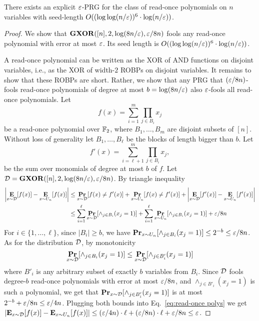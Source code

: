 \begin{thm}\label{thm:read-once poly}
There exists an explicit $\varepsilon$-PRG for the class of read-once polynomials on $n$ variables with seed-length $O((\log \log(n/\varepsilon))^6 \cdot \log(n/\varepsilon))$.
\end{thm}
\begin{proof}
We show that $\mathbf{GXOR}([n],2, \log(8n/\varepsilon),\varepsilon/8n)$ fools any read-once polynomial with error at most $\varepsilon$. Its seed length is $O((\log \log(n/\varepsilon))^6 \cdot \log(n/\varepsilon))$.

	A read-once polynomial can be written as the XOR of AND functions on disjoint variables, i.e., as the XOR of width-$2$ ROBPs on disjoint variables.
	It remains to show that these ROBPs are short.
	Rather, we show that any PRG that $(\varepsilon/8n)$-fools read-once polynomials of degree at most $b = \log(8n/\varepsilon)$ also $\varepsilon$-fools all read-once polynomials.
Let	$$f(x) = \sum_{i=1}^{m} \prod_{j\in B_i} x_j$$ be a read-once polynomial over ${\mathbb{F}}_2$, where $B_1, \ldots, B_m$ are disjoint subsets of $[n]$.
Without loss of generality let $B_1, \ldots, B_\ell$ be the blocks of length bigger than $b$. 
Let $$f'(x) = \sum_{i=\ell+1}^{m} \prod_{j\in B_i} x_j,$$ be the sum over monomials of degree at most $b$ of $f$.
Let ${\mathcal{D}} = \mathbf{GXOR}([n],2, \log(8n/\varepsilon),\varepsilon/8n)$. By triangle inequality
\begin{align}\nonumber\left|\mathop{\bf E\/}_{x\sim {\mathcal{D}}}[f(x)] -\mathop{\bf E\/}_{x\sim U_n}[f(x)]\right| &\le \mathop{\bf Pr\/}_{x\sim {\mathcal{D}}}[f(x) \neq f'(x)] + \mathop{\bf Pr\/}_{x\sim U_n} [f(x) \neq f'(x)] + 
\left|\mathop{\bf E\/}_{x\sim {\mathcal{D}}}[f'(x)] -
\mathop{\bf E\/}_{x\sim U_n}[f'(x)]\right|\\
&\le \sum_{i=1}^{\ell} \mathop{\bf Pr\/}_{x\sim {\mathcal{D}}}[\wedge_{j\in B_i}(x_j=1)] + \sum_{i=1}^{\ell} \mathop{\bf Pr\/}_{x\sim U_n}[\wedge_{j\in B_i}(x_j=1)] + \varepsilon/8n\label{eq:read-once polys}
\end{align}
For $i\in \{1,\ldots, \ell\}$, since $|B_i|\ge b$, we have
$\mathop{\bf Pr\/}_{x\sim U_n}[\wedge_{j\in B_i}(x_j=1)] \le 2^{-b} \le \varepsilon/8n$. 
As for the distribution ${\mathcal{D}}$, by monotonicity 
$$\mathop{\bf Pr\/}_{x\sim {\mathcal{D}}}[\wedge_{j\in B_i}(x_j=1)] \le
\mathop{\bf Pr\/}_{x\sim {\mathcal{D}}}[\wedge_{j\in B'_i}(x_j=1)]$$ where $B'_i$ is any arbitrary subset of exactly $b$ variables from $B_i$. Since ${\mathcal{D}}$ fools degree-$b$ read-once polynomials with error at most $\varepsilon/8n$, and $\wedge_{j\in B'_i}(x_j=1)$ is such a polynomial, we get that $\mathop{\bf Pr\/}_{x\sim {\mathcal{D}}}[\wedge_{j\in B'_i}(x_j=1)]$  is at most $2^{-b} + \varepsilon/8n \le \varepsilon/4n$.
Plugging both bounds into Eq.~\eqref{eq:read-once polys} we get $\left|\mathop{\bf E\/}_{x\sim {\mathcal{D}}}[f(x)] -\mathop{\bf E\/}_{x\sim U_n}[f(x)]\right|\le (\varepsilon/4n)\cdot \ell + (\varepsilon/8n)\cdot \ell + \varepsilon/8n \le \varepsilon$.
\end{proof}


